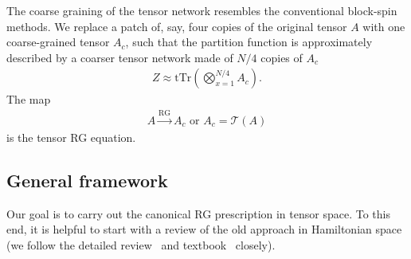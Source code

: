 \documentclass[aps,prb,reprint,superscriptaddress,floatfix]{revtex4-2}
\newcommand{\tTr}{\mathrm{tTr}}
\begin{document}
The coarse graining of the tensor network resembles the conventional block-spin methods.
We replace a patch of, say, four copies of the original tensor $A$ with one coarse-grained tensor $A_c$, such that the partition function is approximately described by a coarser tensor network made of $N/4$ copies of $A_c$
%
\begin{align}\label{eq:ZafterRG}
    Z \approx \tTr\left(\bigotimes_{x=1}^{N/4}A_c\right).
\end{align}
%
The map 
%
\begin{align}\label{def:tensorRGeq}
    A \xrightarrow{\text{RG}} A_c \text{ or } A_c = \mathcal{T}(A) 
\end{align}
is the tensor RG equation.
%

\subsection{General framework\label{RGprescrip}}
Our goal is to carry out the canonical RG prescription in tensor space.
To this end, it is helpful to start with a review of the old approach in Hamiltonian space (we follow the detailed review~\cite{kadanoff2014} and textbook~\cite{cardy_1996} closely).
%
\end{document}
